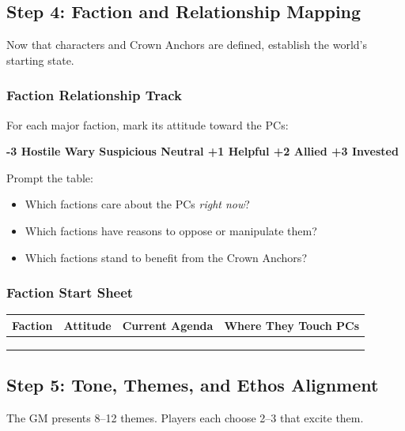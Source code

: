 \documentclass[11pt]{article}
\begin{document}
\subsection{Step 4: Faction and Relationship Mapping}

Now that characters and Crown Anchors are defined, establish the world's starting state.

\subsubsection{Faction Relationship Track}
For each major faction, mark its attitude toward the PCs:

\begin{center}
\textbf{-3 Hostile  Wary  Suspicious  Neutral \quad +1 Helpful \quad +2 Allied \quad +3 Invested}
\end{center}

Prompt the table:
\begin{itemize}
    \item Which factions care about the PCs \emph{right now}?
    \item Which factions have reasons to oppose or manipulate them?
    \item Which factions stand to benefit from the Crown Anchors?
\end{itemize}

\subsubsection{Faction Start Sheet}

\begin{center}
\begin{longtable}{|p{3cm}|p{3cm}|p{3.5cm}|p{3cm}|}
\hline
\textbf{Faction} & \textbf{Attitude} & \textbf{Current Agenda} & \textbf{Where They Touch PCs} \\
\hline
 & & & \\
 & & & \\
 & & & \\
\hline
\end{longtable}
\end{center}

\subsection{Step 5: Tone, Themes, and Ethos Alignment}

The GM presents 8--12 themes. Players each choose 2--3 that excite them.
\end{document}
